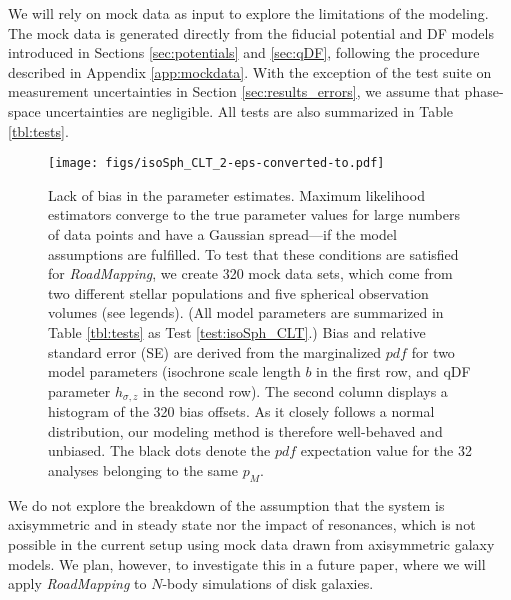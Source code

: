 \documentclass[iop,revtex4,numberedappendix,appendixfloats]{emulateapj}
\newcommand{\pdf}{\ensuremath{pdf}}
\newcommand{\pmodel}{\ensuremath{p_M}}
\newcommand{\RM}{{\sl RoadMapping}}
\begin{document}
We will rely on mock data as input to explore the limitations of the modeling. The mock data is generated directly from the fiducial potential and DF models introduced in Sections \ref{sec:potentials} and \ref{sec:qDF}, following the procedure described in Appendix \ref{app:mockdata}. With the exception of the test suite on measurement uncertainties in Section \ref{sec:results_errors}, we assume that phase-space uncertainties are negligible. All tests are also summarized in Table \ref{tbl:tests}. 

\begin{figure}[!htbp]
\centering
\texttt{[image: figs/isoSph\_CLT\_2-eps-converted-to.pdf]}
\caption{Lack of bias in the parameter estimates. Maximum likelihood estimators converge to the true parameter values for large numbers of data points and have a Gaussian spread---if the model assumptions are fulfilled. To test that these conditions are satisfied for \RM{}, we create 320 mock data sets, which come from two different stellar populations and five spherical observation volumes (see legends). (All model parameters are summarized in Table \ref{tbl:tests} as Test \ref{test:isoSph_CLT}.) Bias and relative standard error (SE) are derived from the marginalized \pdf{} for two model parameters (isochrone scale length $b$ in the first row, and qDF parameter $h_{\sigma,z}$ in the second row). The second column displays a histogram of the 320 bias offsets. As it closely follows a normal distribution, our modeling method is therefore well-behaved and unbiased. The black dots denote the \pdf{} expectation value for the 32 analyses belonging to the same $\pmodel{}$.}
\label{fig:isoSph_CLT}
\end{figure}

We do not explore the breakdown of the assumption that the system is axisymmetric and in steady state nor the impact of resonances, which is not possible in the current setup using mock data drawn from axisymmetric galaxy models. We plan, however, to investigate this in a future paper, where we will apply \RM{} to $N$-body simulations of disk galaxies.


\end{document}

